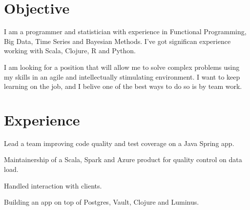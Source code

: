 \documentclass[]{deedy-resume-openfont}
\begin{document}
\hfill
\begin{minipage}[t]{0.66\textwidth} 


\section{Objective}

I am a programmer and statistician with experience in Functional Programming, Big Data, Time Series and Bayesian Methods.
I've got significan experience working with Scala, Clojure, R and Python.

I am looking for a position that will allow me to solve complex problems using my skills in an agile and 
intellectually stimulating environment. I want to keep learning on the job, and I belive one of the best ways
to do so is by team work.
\sectionsep


\section{Experience}

\vspace{\topsep} %
\begin{tightemize}
\item Lead a team improving code quality and test coverage on a Java Spring app. 
\item Maintainership of a Scala, Spark and Azure product for quality control on data load.
\item Handled interaction with clients.
\end{tightemize}
\sectionsep

\begin{tightemize}
\item Building an app on top of Postgres, Vault, Clojure and Luminus.
\end{tightemize}
\sectionsep


\end{minipage}
\end{document}
